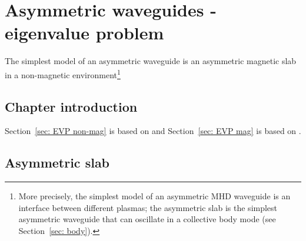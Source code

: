 \documentclass[12pt]{../style-files/ociamthesis}
\begin{document}
\baselineskip=18pt

\setcounter{secnumdepth}{3}
\setcounter{tocdepth}{3}

\setcounter{chapter}{1}


\newcommand{\bv}{\mathbf{v}}
\newcommand{\bB}{\mathbf{B}}


\chapter{Asymmetric waveguides - eigenvalue problem}
\label{chap: EVP}

The simplest model of an asymmetric waveguide is an asymmetric magnetic slab in a non-magnetic environment\footnote{More precisely, the simplest model of an asymmetric MHD waveguide is an interface between different plasmas; the asymmetric slab is the simplest asymmetric waveguide that can oscillate in a collective body mode (see Section~\ref{sec: body}).}

\section{Chapter introduction}
\label{sec: EVP intro}

Section~\ref{sec: EVP non-mag} is based on \cite{all_etal17} and Section~\ref{sec: EVP mag} is based on \cite{zsa_etal18}.

\section{Asymmetric slab}
\label{sec: asym slab}
\end{document}
